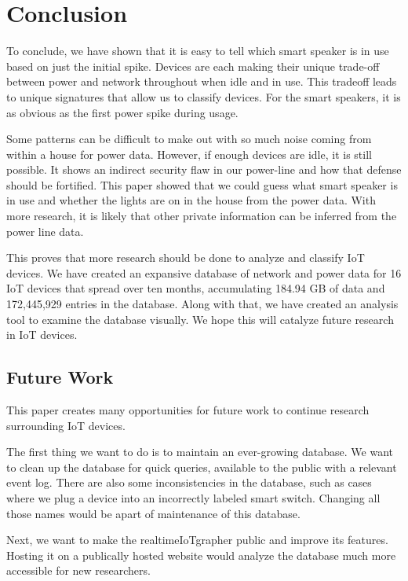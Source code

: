 \chapter{Conclusion}
\label{Conclusion}

To conclude, we have shown that it is easy to tell which smart speaker is in use based on just the initial spike. Devices are each making their unique trade-off between power and network throughout when idle and in use. This tradeoff leads to unique signatures that allow us to classify devices. For the smart speakers, it is as obvious as the first power spike during usage.

Some patterns can be difficult to make out with so much noise coming from within a house for power data. However, if enough devices are idle, it is still possible. It shows an indirect security flaw in our power-line and how that defense should be fortified. This paper showed that we could guess what smart speaker is in use and whether the lights are on in the house from the power data. With more research, it is likely that other private information can be inferred from the power line data.

This proves that more research should be done to analyze and classify IoT devices. We have created an expansive database of network and power data for 16 IoT devices that spread over ten months, accumulating 184.94 GB of data and 172,445,929 entries in the database. Along with that, we have created an analysis tool to examine the database visually. We hope this will catalyze future research in IoT devices.

\section{Future Work}
This paper creates many opportunities for future work to continue research surrounding IoT devices.

The first thing we want to do is to maintain an ever-growing database. We want to clean up the database for quick queries, available to the public with a relevant event log. There are also some inconsistencies in the database, such as cases where we plug a device into an incorrectly labeled smart switch. Changing all those names would be apart of maintenance of this database.

Next, we want to make the realtimeIoTgrapher public and improve its features. Hosting it on a publically hosted website would analyze the database much more accessible for new researchers.

